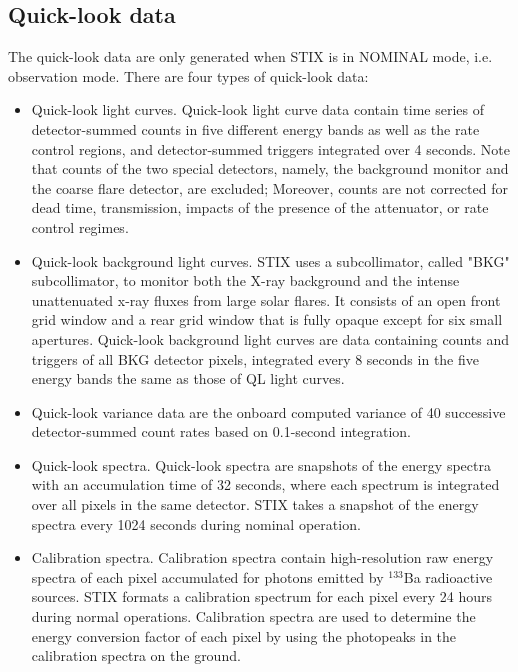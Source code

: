 \documentclass[referee]{aa} %
\begin{document}
\subsection{Quick-look data}
The quick-look data are only generated 
when STIX  is in NOMINAL mode, i.e. observation mode. 
There are four types of quick-look data:
\begin{itemize}
\item Quick-look light curves. Quick-look light curve data contain time series 
of detector-summed counts in five different energy bands as well as the rate control regions, and detector-summed triggers integrated over 4 seconds. Note that counts of the two special detectors, namely, the background monitor and the coarse flare detector, are excluded;   Moreover, counts are not corrected for dead time, transmission, impacts of the presence of the attenuator, or rate control regimes.
\item Quick-look background light curves. STIX uses a subcollimator, called "BKG" subcollimator,  to monitor both the X-ray background and the intense unattenuated x-ray fluxes from large solar flares.   It consists of an open front grid window and a rear grid window that is fully opaque except for six small
apertures.   Quick-look background light curves are data containing counts and triggers of all BKG detector pixels,  integrated every 8 seconds in the five energy bands the same as those of QL light curves. 
\item Quick-look variance data are the onboard computed variance of 40 successive detector-summed count rates based on 0.1-second integration.
\item Quick-look spectra. Quick-look spectra 
 are snapshots of the energy spectra with an accumulation time of 32 seconds, where each spectrum is integrated over all pixels in the same detector.  STIX takes a snapshot of the energy spectra every 1024 seconds during nominal operation.
\item Calibration spectra. 
Calibration spectra contain high-resolution raw energy spectra of each pixel accumulated for photons emitted by  $^{133}$Ba radioactive sources.  STIX formats a calibration spectrum for each pixel every 24 hours during normal operations. 
 Calibration spectra are used to determine the energy conversion factor of each pixel by using the photopeaks in the calibration spectra on the ground.  
\end{itemize}
\end{document}
